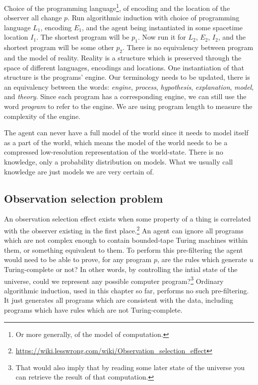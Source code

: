 Choice of the programming language\footnote{Or more generally, of the model of computation.}, of encoding and the location of the observer all change $p$.
Run algorithmic induction with choice of programming language $L_1$, encoding $E_1$, and the agent being instantiated in some spacetime location $I_1$.
The shortest program will be $p_1$.
Now run it for $L_2$, $E_2$, $I_2$, and the shortest program will be some other $p_2$.
There is no equivalency between program and the model of reality.
Reality is a structure which is preserved through the space of different languages, encodings and locations.
One instantiation of that structure is the programs' engine.
Our terminology needs to be updated, there is an equivalency between the words: \textit{engine}, \textit{process}, \textit{hypothesis}, \textit{explanation}, \textit{model}, and \textit{theory}.
Since each program has a corresponding engine, we can still use the word \textit{program} to refer to the engine.
We are using program length to measure the complexity of the engine.

The agent can never have a full model of the world since it needs to model itself as a part of the world, which means the model of the world needs to be a compressed low-resolution representation of the world-state.
There is no knowledge, only a probability distribution on models.
What we usually call knowledge are just models we are very certain of.

\newpage

\subsection{Observation selection problem}

An observation selection effect exists when some property of a thing is correlated with the observer existing in the first place.\footnote{\url{https://wiki.lesswrong.com/wiki/Observation_selection_effect}}
An agent can ignore all programs which are not complex enough to contain bounded-tape Turing machines within them, or something equivalent to them.
To perform this pre-filtering the agent would need to be able to prove, for any program $p$, are the rules which generate $u$ Turing-complete or not?
In other words, by controlling the intial state of the universe, could we represent any possible computer program?\footnote{That would also imply that by reading some later state of the universe you can retrieve the result of that computation.}
Ordinary algorithmic induction, used in this chapter so far, performs no such pre-filtering.
It just generates all programs which are consistent with the data, including programs which have rules which are not Turing-complete.

